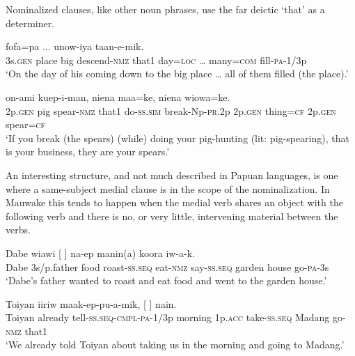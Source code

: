 Nominalized clauses, like other noun phrases, use the far deictic  `that' as a determiner. 

\ea%
\label{ex:x1842}
    fofa=pa  ...  unow-iya taan-e-mik. \\
     3s.\textsc{gen}  place  big  descend-\textsc{nmz}  that1  day=\textsc{loc}  {\dots}  many=\textsc{com} fill-\textsc{pa}-1/3p \\
\glt `On the day of his coming down to the big place {\dots} all of them filled (the place).'
\z

\ea%
\label{ex:x1843}
    on-ami  kuep-i-man, niena  maa=ke,  niena  wiowa=ke. \\
     2p.\textsc{gen}  pig  spear-\textsc{nmz}  that1  do-\textsc{ss}.\textsc{sim}  break-Np-\textsc{pr}.2p 2p.\textsc{gen}  thing=\textsc{cf}  2p.\textsc{gen}  spear=\textsc{cf} \\
\glt `If you break (the spears) (while) doing your pig-hunting (lit: pig-spearing), that is your business, they are your spears.'
\z

An interesting structure, and not much described in Papuan languages, is one where a same-subject medial clause is in the scope of the nominalization. In Mauwake this tends to happen when the medial verb shares an object with the following verb and there is no, or very little, intervening material between the verbs. 

\ea%
\label{ex:x1885}
\gll Dabe  wiawi  [  ]  na-ep manin(a)  koora  iw-a-k. \\
     Dabe  3s/p.father  food  roast-\textsc{ss}.\textsc{seq}  eat-\textsc{nmz}  say-\textsc{ss}.\textsc{seq} garden  house  go-\textsc{pa}-3s \\
\glt `Dabe's father wanted to roast and eat food and went to the garden house.'
\z

\ea%
\label{ex:x1845}
\gll Toiyan  iiriw  maak-ep-pu-a-mik,  [    ]  nain. \\
     Toiyan  already  tell-\textsc{ss}.\textsc{seq}-\textsc{cmpl}-\textsc{pa}-1/3p  morning  1p.\textsc{acc} take-\textsc{ss}.\textsc{seq}  Madang  go-\textsc{nmz}  that1 \\
\glt `We already told Toiyan about taking us in the morning and going to Madang.'
\z


